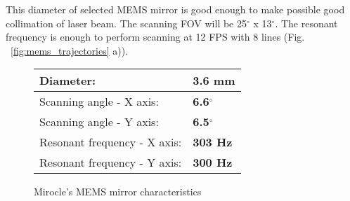 \vspace{1cm}

\noindent%
\begin{minipage}[H]{0.5\linewidth}
This diameter of selected MEMS mirror is good enough to make possible good collimation of laser beam. The scanning FOV will be 25$^\circ$ x 13$^\circ$. The resonant frequency is enough to perform scanning at 12 FPS with 8 lines (Fig. ~\ref{fig:mems_trajectories} a)). 


\end{minipage}
\hfill
\begin{minipage}[h]{0.48\linewidth}
\begin{figure}[H]


\begin{tabular}{|M{3cm}|M{3cm}|}
\hline
Diameter: & \textbf{3.6 mm} \\  \hline
Scanning angle - X axis: & \textbf{6.6$\pmb{{^\circ}}$}  \\ \hline
Scanning angle - Y axis: & \textbf{6.5$\pmb{{^\circ}}$} \\  \hline
Resonant frequency - X axis: & \textbf{303 Hz} \\  \hline
Resonant frequency - Y axis: & \textbf{300 Hz} \\  \hline
\end{tabular}
\caption{Mirocle's MEMS mirror characteristics}
\label{tbl:mems_characteristics}

\end{figure}
\end{minipage}
\vspace{1cm}













